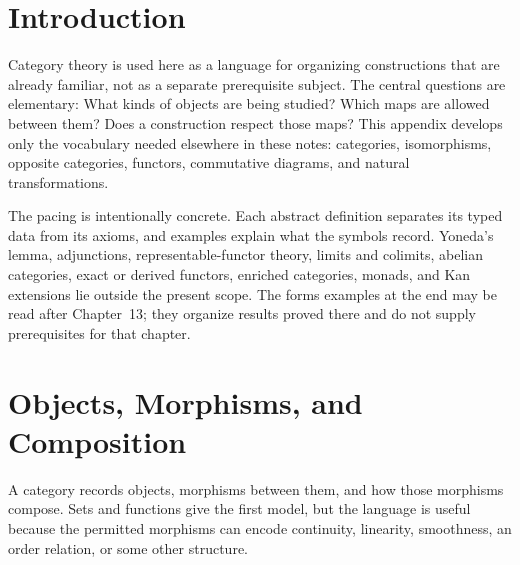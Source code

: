 \label{app:categories}

\section*{Introduction}
Category theory is used here as a language for organizing constructions that
are already familiar, not as a separate prerequisite subject. The central
questions are elementary: What kinds of objects are being studied? Which maps
are allowed between them? Does a construction respect those maps? This
appendix develops only the vocabulary needed elsewhere in these notes:
categories, isomorphisms, opposite categories, functors, commutative diagrams,
and natural transformations.

The pacing is intentionally concrete. Each abstract definition separates its
typed data from its axioms, and examples explain what the symbols record.
Yoneda's lemma, adjunctions, representable-functor theory, limits and colimits,
abelian categories, exact or derived functors, enriched categories, monads,
and Kan extensions lie outside the present scope. The forms examples at the
end may be read after Chapter~13; they organize results proved there and do
not supply prerequisites for that chapter.

\section{Objects, Morphisms, and Composition}
A category records objects, morphisms between them, and how those morphisms
compose. Sets and functions give the first model, but the language is useful
because the permitted morphisms can encode continuity, linearity, smoothness,
an order relation, or some other structure.

